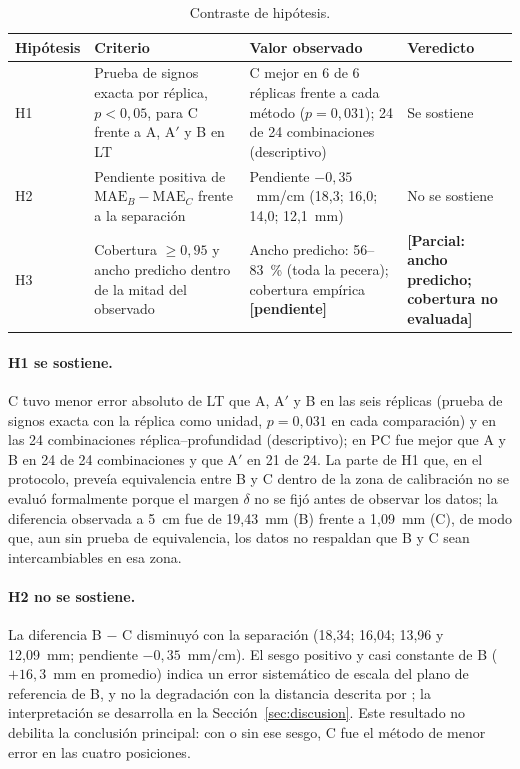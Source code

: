 \documentclass{report}
\newcommand{\Aprime}{A$'$}
\newcommand{\pend}[1]{\textbf{[#1]}}
\begin{document}
\begin{table}[htbp]

\caption{Contraste de hipótesis.}
\label{tab:hipotesis}
\begin{tabular}{@{}p{1.2cm} X X p{2.3cm}@{}}
\hline
Hipótesis & Criterio & Valor observado & Veredicto \\
\hline
H1 & Prueba de signos exacta por réplica, $p < 0{,}05$, para C frente a A, \Aprime{} y B en LT & C mejor en 6 de 6 réplicas frente a cada método ($p = 0{,}031$); 24 de 24 combinaciones (descriptivo) & Se sostiene \\
H2 & Pendiente positiva de $\mathrm{MAE}_B - \mathrm{MAE}_C$ frente a la separación & Pendiente $-0{,}35$~mm/cm (18,3; 16,0; 14,0; 12,1~mm) & No se sostiene \\
H3 & Cobertura $\geq 0{,}95$ y ancho predicho dentro de la mitad del observado & Ancho predicho: 56--83~\% (toda la pecera); cobertura empírica \pend{pendiente} & \pend{Parcial: ancho predicho; cobertura no evaluada} \\
\hline
\end{tabular}
\end{table}

\paragraph{H1 se sostiene.} C tuvo menor error absoluto de LT que A, \Aprime{} y B en las seis réplicas (prueba de signos exacta con la réplica como unidad, $p = 0{,}031$ en cada comparación) y en las 24 combinaciones réplica--profundidad (descriptivo); en PC fue mejor que A y B en 24 de 24 combinaciones y que \Aprime{} en 21 de 24. La parte de H1 que, en el protocolo, preveía equivalencia entre B y C dentro de la zona de calibración no se evaluó formalmente porque el margen $\delta$ no se fijó antes de observar los datos; la diferencia observada a 5~cm fue de 19,43~mm (B) frente a 1,09~mm (C), de modo que, aun sin prueba de equivalencia, los datos no respaldan que B y C sean intercambiables en esa zona.

\paragraph{H2 no se sostiene.} La diferencia B $-$ C disminuyó con la separación (18,34; 16,04; 13,96 y 12,09~mm; pendiente $-0{,}35$~mm/cm). El sesgo positivo y casi constante de B ($+16{,}3$~mm en promedio) indica un error sistemático de escala del plano de referencia de B, y no la degradación con la distancia descrita por \textcite{Rofallski2022}; la interpretación se desarrolla en la Sección~\ref{sec:discusion}. Este resultado no debilita la conclusión principal: con o sin ese sesgo, C fue el método de menor error en las cuatro posiciones.
\end{document}
